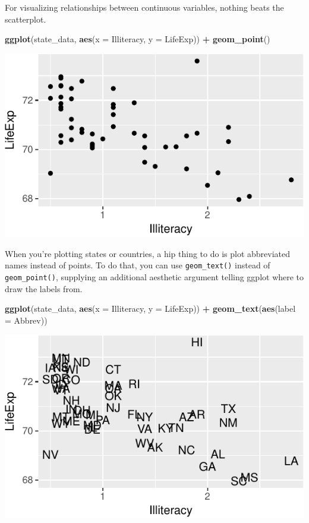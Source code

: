 \documentclass[12pt,oneside,openany]{book}
\newenvironment{Shaded}{\begin{snugshade}}{\end{snugshade}}
\newcommand{\KeywordTok}[1]{\textcolor[rgb]{0.13,0.29,0.53}{\textbf{#1}}}
\newcommand{\DataTypeTok}[1]{\textcolor[rgb]{0.13,0.29,0.53}{#1}}
\newcommand{\StringTok}[1]{\textcolor[rgb]{0.31,0.60,0.02}{#1}}
\newcommand{\OperatorTok}[1]{\textcolor[rgb]{0.81,0.36,0.00}{\textbf{#1}}}
\newcommand{\NormalTok}[1]{#1}
\begin{document}
For visualizing relationships between continuous variables, nothing
beats the scatterplot.

\begin{Shaded}
\begin{Highlighting}[]
\KeywordTok{ggplot}\NormalTok{(state_data, }\KeywordTok{aes}\NormalTok{(}\DataTypeTok{x =}\NormalTok{ Illiteracy, }\DataTypeTok{y =}\NormalTok{ LifeExp)) }\OperatorTok{+}
\StringTok{  }\KeywordTok{geom_point}\NormalTok{()}
\end{Highlighting}
\end{Shaded}

\includegraphics{pdaps_files/figure-latex/scatter-1.pdf}

When you're plotting states or countries, a hip thing to do is plot
abbreviated names instead of points. To do that, you can use
\texttt{geom\_text()} instead of \texttt{geom\_point()}, supplying an
additional aesthetic argument telling ggplot where to draw the labels
from.

\begin{Shaded}
\begin{Highlighting}[]
\KeywordTok{ggplot}\NormalTok{(state_data, }\KeywordTok{aes}\NormalTok{(}\DataTypeTok{x =}\NormalTok{ Illiteracy, }\DataTypeTok{y =}\NormalTok{ LifeExp)) }\OperatorTok{+}
\StringTok{  }\KeywordTok{geom_text}\NormalTok{(}\KeywordTok{aes}\NormalTok{(}\DataTypeTok{label =}\NormalTok{ Abbrev))}
\end{Highlighting}
\end{Shaded}

\includegraphics{pdaps_files/figure-latex/scatter-text-1.pdf}
\end{document}
